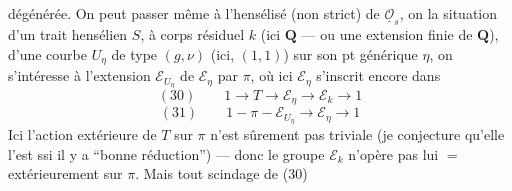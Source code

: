 dégénérée. On peut passer même à l'hensélisé (non strict) de $\underline{\mathcal O}_s$, on  la situation d'un trait hensélien $S$, à corps résiduel $k$ (ici $\mathbf Q$ --- ou une extension finie de $\mathbf Q$), d'une courbe $U_\eta$ de type $(g,\nu)$ (ici, $(1,1)$) sur son pt générique $\eta$, on s'intéresse à l'extension $\mathcal E_{U_\eta}$ de $\mathcal E_\eta$ par $\pi$, où ici $\mathcal E_\eta$ s'inscrit encore dans
\[
(30)\qquad 1\longrightarrow T\longrightarrow\mathcal E_\eta\longrightarrow\mathcal E_k\longrightarrow1
\]
 
\[
(31)\qquad 1-\pi-\mathcal E_{U_\eta}\longrightarrow\mathcal E_\eta\longrightarrow1
\]
Ici l'action extérieure de $T$ sur $\pi$ n'est sûrement pas triviale (je conjecture qu'elle l'est ssi il y a ``bonne réduction'') --- donc le groupe $\mathcal E_k$ n'opère pas lui $=$ extérieurement sur $\pi$. Mais tout scindage de (30)
